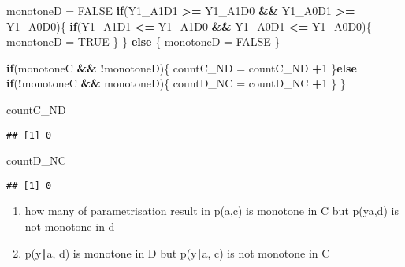 \documentclass[
]{article}
\newenvironment{Shaded}{\begin{snugshade}}{\end{snugshade}}
\newcommand{\ConstantTok}[1]{\textcolor[rgb]{0.56,0.35,0.01}{#1}}
\newcommand{\ControlFlowTok}[1]{\textcolor[rgb]{0.13,0.29,0.53}{\textbf{#1}}}
\newcommand{\DecValTok}[1]{\textcolor[rgb]{0.00,0.00,0.81}{#1}}
\newcommand{\NormalTok}[1]{#1}
\newcommand{\OtherTok}[1]{\textcolor[rgb]{0.56,0.35,0.01}{#1}}
\newcommand{\SpecialCharTok}[1]{\textcolor[rgb]{0.81,0.36,0.00}{\textbf{#1}}}
\begin{document}
\begin{Shaded}
\begin{Highlighting}[]
\NormalTok{      monotoneD }\OtherTok{=} \ConstantTok{FALSE}
   \ControlFlowTok{if}\NormalTok{(Y1\_A1D1 }\SpecialCharTok{\textgreater{}=}\NormalTok{ Y1\_A1D0 }\SpecialCharTok{\&\&}\NormalTok{ Y1\_A0D1 }\SpecialCharTok{\textgreater{}=}\NormalTok{ Y1\_A0D0)\{}
    \ControlFlowTok{if}\NormalTok{(Y1\_A1D1 }\SpecialCharTok{\textless{}=}\NormalTok{ Y1\_A1D0 }\SpecialCharTok{\&\&}\NormalTok{ Y1\_A0D1 }\SpecialCharTok{\textless{}=}\NormalTok{ Y1\_A0D0)\{}
\NormalTok{      monotoneD }\OtherTok{=} \ConstantTok{TRUE}
\NormalTok{    \}}
\NormalTok{    \} }\ControlFlowTok{else}\NormalTok{ \{}
\NormalTok{    monotoneD }\OtherTok{=} \ConstantTok{FALSE}
\NormalTok{  \}}
 
 
  \ControlFlowTok{if}\NormalTok{(monotoneC }\SpecialCharTok{\&\&} \SpecialCharTok{!}\NormalTok{monotoneD)\{}
\NormalTok{    countC\_ND }\OtherTok{=}\NormalTok{ countC\_ND }\SpecialCharTok{+}\DecValTok{1}
\NormalTok{  \}}\ControlFlowTok{else} \ControlFlowTok{if}\NormalTok{(}\SpecialCharTok{!}\NormalTok{monotoneC }\SpecialCharTok{\&\&}\NormalTok{ monotoneD)\{}
\NormalTok{    countD\_NC }\OtherTok{=}\NormalTok{ countD\_NC }\SpecialCharTok{+}\DecValTok{1} 
\NormalTok{  \}}
\NormalTok{\}}

\NormalTok{countC\_ND}
\end{Highlighting}
\end{Shaded}

\begin{verbatim}
## [1] 0
\end{verbatim}

\begin{Shaded}
\begin{Highlighting}[]
\NormalTok{countD\_NC}
\end{Highlighting}
\end{Shaded}

\begin{verbatim}
## [1] 0
\end{verbatim}

\begin{enumerate}
\def\labelenumi{\roman{enumi})}
\item
  how many of parametrisation result in p(\textbar a,c) is monotone in C
  but p(y\textbar a,d) is not monotone in d
\item
  p(y∣a, d) is monotone in D but p(y∣a, c) is not monotone in C
\end{enumerate}
\end{document}
